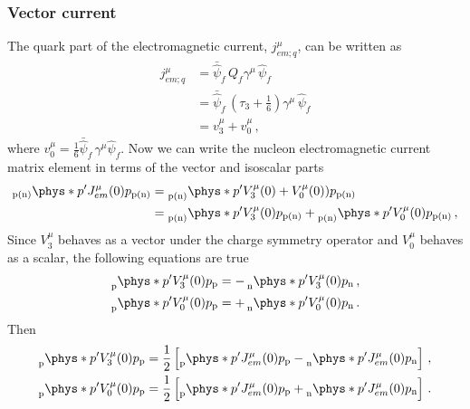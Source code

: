   \subsubsection{Vector current}

    The quark part of the electromagnetic current, $j^{\mu}_{em;q}$, can be
    written as~\cite{Alberico:2001sd}
    \begin{equation}\label{eq:emcurrent30}
      \begin{aligned}
        j^{\mu}_{em;q} &= \bar{\hat{\psi}}_f \, Q_f \gamma^{\mu}\, \hat{\psi}_f \\
                       &= \bar{\hat{\psi}}_f \, (\tau_3 + \frac{1}{6})\gamma^{\mu} \, \hat{\psi}_f \\
                       &= v^{\mu}_3 + v^{\mu}_0 \,,
      \end{aligned}
    \end{equation}
    where $v^{\mu}_0 = \frac{1}{6}\bar{\hat{\psi}}_f \, \gamma^{\mu}
    \hat{\psi}_f$. Now we can write the nucleon electromagnetic current matrix
    element in terms of the vector and isoscalar parts
    \begin{equation}
      \begin{aligned}
        _{\textrm{p(n)}}\phys*{p'}{J^{\mu}_{em}(0)}{p}_{\textrm{p(n)}} 
            &= \prescript{}{\textrm{p(n)}}{\phys*{p'}{V^{\mu}_3(0) + V^{\mu}_0(0))}{p}}_{\textrm{p(n)}} \\
            &= \prescript{}{\textrm{p(n)}}{\phys*{p'}{V^{\mu}_3(0)}{p}}_{\textrm{p(n)}} 
             + \prescript{}{\textrm{p(n)}}{\phys*{p'}{V^{\mu}_0(0)}{p}}_{\textrm{p(n)}} \,,
      \end{aligned}
    \end{equation}
    Since $V^{\mu}_3$ behaves as a vector under the charge symmetry operator
    and $V^{\mu}_0$ behaves as a scalar, the following equations are true
    \begin{equation}
      \begin{aligned}
        \prescript{}{\textrm{p}}{\phys*{p'}{V^{\mu}_3(0)}{p}}_{\textrm{p}} 
          &= - \prescript{}{\textrm{n}}{\phys*{p'}{V^{\mu}_3(0)}{p}}_{\textrm{n}} \,, \\
        \prescript{}{\textrm{p}}{\phys*{p'}{V^{\mu}_0(0)}{p}}_{\textrm{p}} 
          &= + \prescript{}{\textrm{n}}{\phys*{p'}{V^{\mu}_0(0)}{p}}_{\textrm{n}} \,. \\
      \end{aligned}
    \end{equation}
    Then
    \begin{align}\label{eq:V3em}
      \prescript{}{\textrm{p}}{\phys*{p'}{V^{\mu}_3(0)}{p}}_{\textrm{p}} 
        &= \frac{1}{2} \left[\prescript{}{\textrm{p}}{\phys*{p'}{J^{\mu}_{em}(0)}{p}}_{\textrm{p}} 
         - \prescript{}{\textrm{n}}{\phys*{p'}{J^{\mu}_{em}(0)}{p}}_{\textrm{n}} \right] \,, \\
      \prescript{}{\textrm{p}}{\phys*{p'}{V^{\mu}_0(0)}{p}}_{\textrm{p}} 
        &= \frac{1}{2} \left[\prescript{}{\textrm{p}}{\phys*{p'}{J^{\mu}_{em}(0)}{p}}_{\textrm{p}} 
         + \prescript{}{\textrm{n}}{\phys*{p'}{J^{\mu}_{em}(0)}{p}}_{\textrm{n}} \right] \,.
    \end{align}
